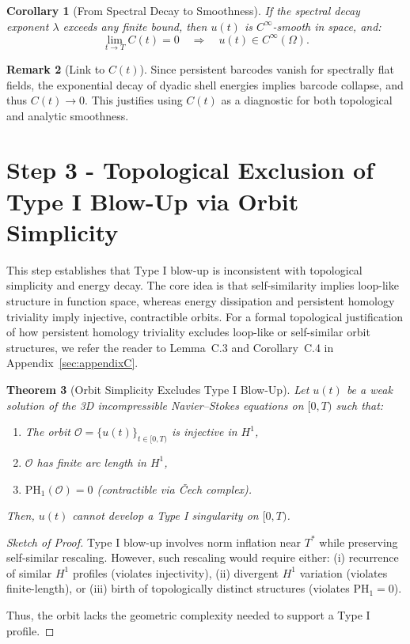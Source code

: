 \documentclass[11pt]{article}
\newtheorem{theorem}{Theorem}[section]
\newtheorem{corollary}[theorem]{Corollary}
\theoremstyle{definition}
\newtheorem{remark}[theorem]{Remark}
\begin{document}
\begin{corollary}[From Spectral Decay to Smoothness]
If the spectral decay exponent $\lambda$ exceeds any finite bound, then $u(t)$ is $C^\infty$-smooth in space, and:
\[
\lim_{t \to T} C(t) = 0 \quad \Rightarrow \quad u(t) \in C^\infty(\Omega).
\]
\end{corollary}

\begin{remark}[Link to $C(t)$]
Since persistent barcodes vanish for spectrally flat fields, the exponential decay of dyadic shell energies implies barcode collapse, and thus $C(t) \to 0$. This justifies using $C(t)$ as a diagnostic for both topological and analytic smoothness.
\end{remark}


\section{Step 3 - Topological Exclusion of Type I Blow-Up via Orbit Simplicity}

This step establishes that Type I blow-up is inconsistent with topological simplicity and energy decay. The core idea is that self-similarity implies loop-like structure in function space, whereas energy dissipation and persistent homology triviality imply injective, contractible orbits.
For a formal topological justification of how persistent homology triviality excludes loop-like or self-similar orbit structures, we refer the reader to Lemma~C.3 and Corollary~C.4 in Appendix~\ref{sec:appendixC}.


\begin{theorem}[Orbit Simplicity Excludes Type I Blow-Up]
Let $u(t)$ be a weak solution of the 3D incompressible Navier–Stokes equations on $[0,T)$ such that:
\begin{enumerate}
    \item The orbit $\mathcal{O} = \{u(t)\}_{t \in [0,T)}$ is injective in $H^1$,
    \item $\mathcal{O}$ has finite arc length in $H^1$,
    \item $\mathrm{PH}_1(\mathcal{O}) = 0$ (contractible via Čech complex).
\end{enumerate}
Then, $u(t)$ cannot develop a Type I singularity on $[0,T)$.
\end{theorem}

\begin{proof}[Sketch of Proof]
Type I blow-up involves norm inflation near $T^*$ while preserving self-similar rescaling.  
However, such rescaling would require either:  
(i) recurrence of similar $H^1$ profiles (violates injectivity),  
(ii) divergent $H^1$ variation (violates finite-length), or  
(iii) birth of topologically distinct structures (violates $\mathrm{PH}_1 = 0$).  

Thus, the orbit lacks the geometric complexity needed to support a Type I profile.
\end{proof}
        
\end{document}
